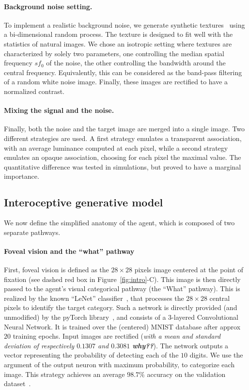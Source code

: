 \paragraph{Background noise setting. } To implement a realistic background noise, we generate synthetic textures~\citep{Sanz12} using a bi-dimensional random process. %
The texture is designed to fit well with the statistics of natural images. We chose an isotropic setting where textures are characterized by solely two parameters, one controlling the median spatial frequency $sf_0$ of the noise, the other controlling the bandwidth around the central frequency. Equivalently, this can be considered as the band-pass filtering of a random white noise image. Finally, these images are rectified to have a normalized contrast.

\paragraph{Mixing the signal and the noise. } Finally, both the noise and the target image are merged into a single image. Two different strategies are used. A first strategy emulates a transparent association, with an average luminance computed at each pixel, while a second strategy emulates an opaque association, choosing for each pixel the maximal value. The quantitative difference was tested in simulations, but proved to have a marginal importance.
%
\subsection{Interoceptive generative model}
%
We  now define the simplified anatomy of the agent, which is composed of two separate pathways.

\paragraph{Foveal vision and the ``what'' pathway}
First, foveal vision is defined as the $28\times 28$ pixels image centered at the point of fixation (see dashed red box in Figure~\ref{fig:intro}-C). This image is then directly passed to the agent's visual categorical pathway (the ``What'' pathway). This is realized by the known ``LeNet'' classifier~\citep{Lecun1998}, that processes the $28 \times 28$ central pixels to identify the target category. Such a network is directly provided (and unmodified) by the pyTorch library~\citep{Paszke17}, and consists of a 3-layered Convolutional Neural Network. It is trained over the (centered) MNIST database after approx $20$ training epochs. \ICANN
\else
Input images are rectified (\emph{with a mean and standard deviation of respectively $0.1307$ and $0.3081$ {\bf why??}}). \fi The network outputs a vector representing the probability of detecting each of the $10$ digits. We use the argument of the output neuron with maximum probability, to categorize each image. This strategy achieves an average $98.7\%$ accuracy on the validation dataset~\citep{Lecun1998}. %

